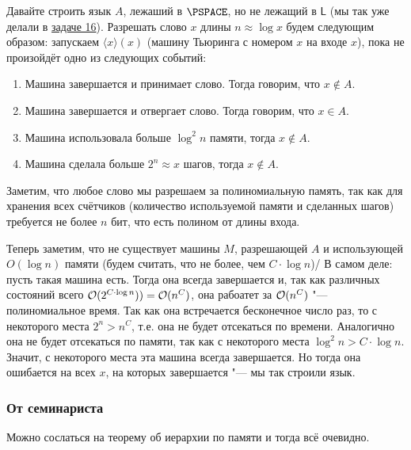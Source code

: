 		Давайте строить язык $A$, лежаший в $\PSPACE$, но не лежащий в $\mathsf{L}$ (мы так уже делали в \hyperref[prob16]{задаче 16}).
		Разрешать слово $x$ длины $n \approx \log x$ будем следующим образом: запускаем $\langle x \rangle(x)$
		(машину Тьюринга с номером $x$ на входе $x$), пока не произойдёт одно из следующих событий:
		\begin{enumerate}
			\item Машина завершается и принимает слово. Тогда говорим, что $x \notin A$.
			\item Машина завершается и отвергает слово. Тогда говорим, что $x \in A$.
			\item Машина использовала больше $\log^2 n$ памяти, тогда $x \notin A$.
			\item Машина сделала больше $2^n \approx x$ шагов, тогда $x \notin A$.
		\end{enumerate}
		Заметим, что любое слово мы разрешаем за полиномиальную память, так как для хранения
		всех счётчиков (количество используемой памяти и сделанных шагов) требуется не более
		$n$ бит, что есть полином от длины входа.
		
		Теперь заметим, что не существует машины $M$, разрешающей $A$ и использующей $O(\log n)$ памяти
		(будем считать, что не более, чем $C\cdot \log n$)/
		В самом деле: пусть такая машина есть.
		Тогда она всегда завершается и, так как различных состояний всего $\mathcal O(2^{C \cdot \log n}))=\mathcal O(n^C)$,
		она рабоатет за $\mathcal O(n^C)$ "--- полиномиальное время.
		Так как она встречается бесконечное число раз, то с некоторого места $2^n > n^C$, т.е. она
		не будет отсекаться по времени.
		Аналогично она не будет отсекаться по памяти, так как с некоторого места $\log^2n > C \cdot \log n$.
		Значит, с некоторого места эта машина всегда завершается.
		Но тогда она ошибается на всех $x$, на которых завершается "--- мы так строили язык.

	\subsubsection{От семинариста}
		Можно сослаться на теорему об иерархии по памяти и тогда всё очевидно.
